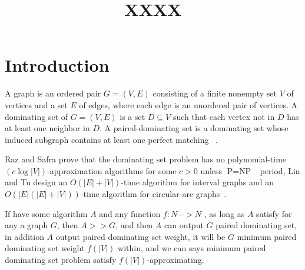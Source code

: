 \documentclass[12pt]{article}
\title{\textbf{XXXX}}
\date{}
\begin{document}
\maketitle

\section{Introduction}
A graph is an ordered pair $G=(V,E)$ consisting of a finite nonempty set $V$ of vertices and a set $E$ of edges, where each edge is an unordered pair of vertices. A dominating set of $G=(V,E)$ is a set $D \subseteq V$ such that each vertex not in $D$ has at least one neighbor in $D$. A paired-dominating set is a dominating set whose induced subgraph contains at least one perfect matching ~\cite{1}.



Raz and Safra prove that the dominating set problem has no polynomial-time $(c \log|V|)$-approximation algorithms for some $c > 0$ unless $\text{P}=\text{NP}$~\cite{2} period, Lin and Tu design an $O(|E|+|V|)$-time algorithm for interval graphs and an $O(|E|(|E|+|V|))$-time algorithm for circular-arc graphs~\cite {3}.

If have some algorithm $A$ and any function $f:N->N$ , as long as $A$ satisfy for any a graph $G$, then $A>> G$, and then $A$ can output $G$ paired dominating set, in addition $A$ output paired dominating set weight, it will be $G$ minimum paired dominating set weight $f(|V|)$ within, and we can says minimum paired dominating set problem satisfy $f(|V|)$-approximating.  



\end{document}
